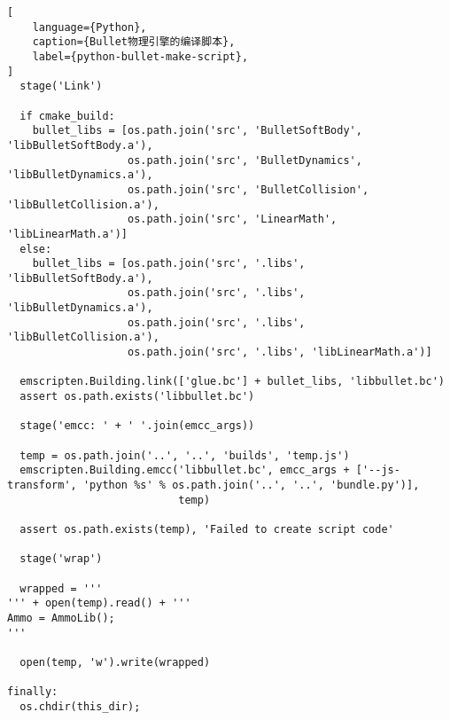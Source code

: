 \begin{lstlisting}[
    language={Python},
    caption={Bullet物理引擎的编译脚本},
    label={python-bullet-make-script},
]
  stage('Link')

  if cmake_build:
    bullet_libs = [os.path.join('src', 'BulletSoftBody', 'libBulletSoftBody.a'),
                   os.path.join('src', 'BulletDynamics', 'libBulletDynamics.a'),
                   os.path.join('src', 'BulletCollision', 'libBulletCollision.a'),
                   os.path.join('src', 'LinearMath', 'libLinearMath.a')]
  else:
    bullet_libs = [os.path.join('src', '.libs', 'libBulletSoftBody.a'),
                   os.path.join('src', '.libs', 'libBulletDynamics.a'),
                   os.path.join('src', '.libs', 'libBulletCollision.a'),
                   os.path.join('src', '.libs', 'libLinearMath.a')]

  emscripten.Building.link(['glue.bc'] + bullet_libs, 'libbullet.bc')
  assert os.path.exists('libbullet.bc')

  stage('emcc: ' + ' '.join(emcc_args))

  temp = os.path.join('..', '..', 'builds', 'temp.js')
  emscripten.Building.emcc('libbullet.bc', emcc_args + ['--js-transform', 'python %s' % os.path.join('..', '..', 'bundle.py')],
                           temp)

  assert os.path.exists(temp), 'Failed to create script code'

  stage('wrap')

  wrapped = '''
''' + open(temp).read() + '''
Ammo = AmmoLib();
'''

  open(temp, 'w').write(wrapped)

finally:
  os.chdir(this_dir);


\end{lstlisting}